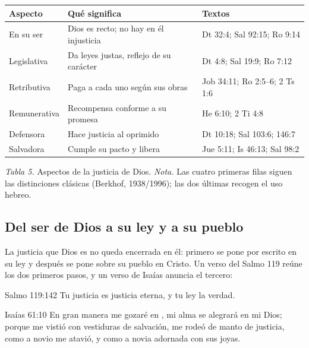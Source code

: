 \begin{center}\small\renewcommand{\arraystretch}{1.2}
\begin{tabular}{@{}L{3.3cm}L{5.5cm}L{5.6cm}@{}}
\toprule
\textbf{Aspecto} & \textbf{Qué significa} & \textbf{Textos} \\ \midrule
En su ser & Dios es recto; no hay en él injusticia & Dt 32:4; Sal 92:15; Ro 9:14 \\
Legislativa & Da leyes justas, reflejo de su carácter & Dt 4:8; Sal 19:9; Ro 7:12 \\
Retributiva & Paga a cada uno según sus obras & Job 34:11; Ro 2:5--6; 2 Ts 1:6 \\
Remunerativa & Recompensa conforme a su promesa & He 6:10; 2 Ti 4:8 \\
Defensora & Hace justicia al oprimido & Dt 10:18; Sal 103:6; 146:7 \\
Salvadora & Cumple su pacto y libera & Jue 5:11; Is 46:13; Sal 98:2 \\
\bottomrule
\end{tabular}\par
{\footnotesize\color{gris}\textit{Tabla 5.} Aspectos de la justicia de Dios. \textit{Nota.} Las cuatro primeras filas siguen las distinciones clásicas (Berkhof, 1938/1996); las dos últimas recogen el uso hebreo.}
\end{center}

\subsection{Del ser de Dios a su ley y a su pueblo}
La justicia que Dios es no queda encerrada en él: primero se pone por escrito en su ley y después se pone sobre su pueblo en Cristo. Un verso del Salmo 119 reúne los dos primeros pasos, y un verso de Isaías anuncia el tercero:

\begin{verso}{Salmo 119:142}
Tu justicia es justicia eterna, y tu ley la verdad.
\end{verso}
\begin{verso}{Isaías 61:10}
En gran manera me gozaré en \SENOR, mi alma se alegrará en mi Dios; porque me vistió con vestiduras de salvación, me rodeó de manto de justicia, como a novio me atavió, y como a novia adornada con sus joyas.
\end{verso}

